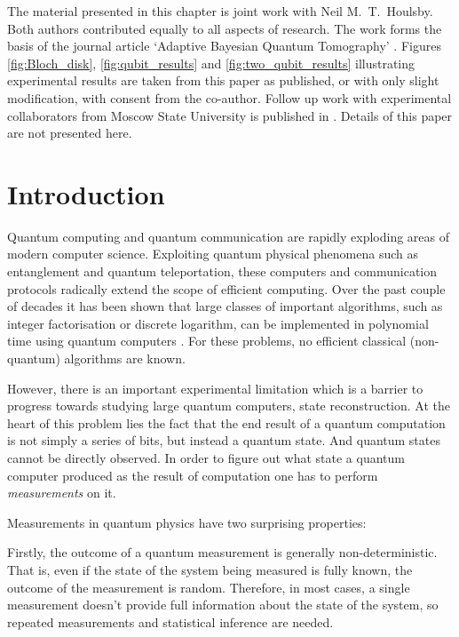 
\begin{summarycontributions}
 The material presented in this chapter is joint work with Neil M.\ T.\ Houlsby. Both authors contributed equally to all aspects of research. The work forms the basis of the journal article `Adaptive Bayesian Quantum Tomography' \citep{Huszar2012quantum}. Figures \ref{fig:Bloch_disk}, \ref{fig:qubit_results} and \ref{fig:two_qubit_results} illustrating experimental results are taken from this paper as published, or with only slight modification, with consent from the co-author.
 Follow up work with experimental collaborators from Moscow State University is published in \citep*{Kravrsov13PRA}. Details of this paper are not presented here.
\end{summarycontributions}

\section{Introduction}

Quantum computing and quantum communication are rapidly exploding areas of modern computer science. Exploiting quantum physical phenomena such as entanglement and quantum teleportation, these computers and communication protocols radically extend the scope of efficient computing. Over the past couple of decades it has been shown that large classes of important algorithms, such as integer factorisation or discrete logarithm, can be implemented in polynomial time using quantum computers \citep{Shor1994,Shor1997}. For these problems, no efficient classical (non-quantum) algorithms are known.

However, there is an important experimental limitation which is a barrier to progress towards studying large quantum computers, state reconstruction. At the heart of this problem lies the fact that the end result of a quantum computation is not simply a series of bits, but instead a quantum state. And quantum states cannot be directly observed. In order to figure out what state a quantum computer produced as the result of computation one has to perform \emph{measurements} on it.

Measurements in quantum physics have two surprising properties:

Firstly, the outcome of a quantum measurement is generally non-deterministic. That is, even if the state of the system being measured is fully known, the outcome of the measurement is random. Therefore, in most cases, a single measurement doesn't provide full information about the state of the system, so repeated measurements and statistical inference are needed.

